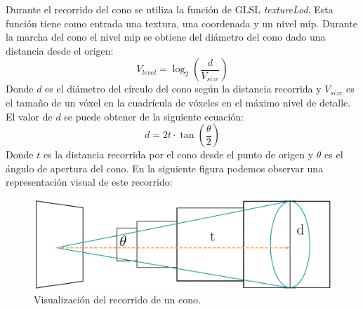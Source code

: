 Durante el recorrido del cono se utiliza la función de GLSL \emph{textureLod}. Esta función tiene como entrada una textura, una coordenada y un nivel mip. Durante la marcha del cono el nivel mip se obtiene del diámetro del cono dado una distancia desde el origen:
\begin{equation}
    V_{level} = \log_2\left(\frac{d}{V_{size}}\right)
\end{equation}
Donde $d$ es el diámetro del círculo del cono según la distancia recorrida y $V_{size}$ es el tamaño de un vóxel en la cuadrícula de vóxeles en el máximo nivel de detalle. El valor de $d$ se puede obtener de la siguiente ecuación:
\begin{equation}
    d = 2t\cdot\tan\left(\frac{\theta}{2}\right)
\end{equation}
Donde $t$ es la distancia recorrida por el cono desde el punto de origen y $\theta$ es el ángulo de apertura del cono. En la siguiente figura podemos observar una representación visual de este recorrido:
\begin{figure}[H]
    \centering
    \captionsetup{justification=centering}
    \includegraphics[width=.9\linewidth]{media/cone.pdf}
    \caption{Visualización del recorrido de un cono.}
\end{figure}

